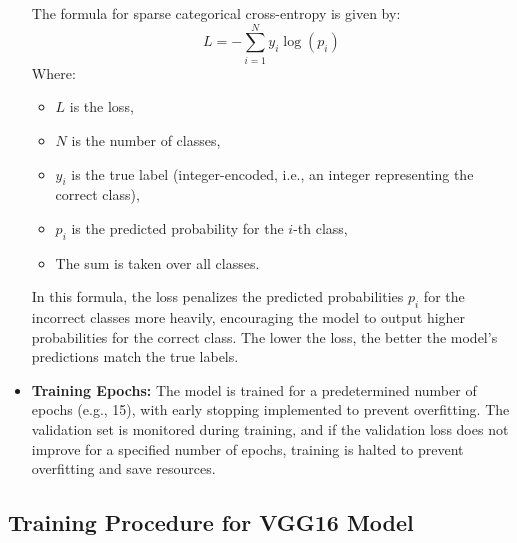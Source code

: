 \documentclass{article}
\begin{document}
\begin{itemize}
The formula for sparse categorical cross-entropy is given by:
\[
L = - \sum_{i=1}^{N} y_i \log(p_i)
\]
Where:
\begin{itemize}
    \item \( L \) is the loss,
    \item \( N \) is the number of classes,
    \item \( y_i \) is the true label (integer-encoded, i.e., an integer representing the correct class),
    \item \( p_i \) is the predicted probability for the \( i \)-th class,
    \item The sum is taken over all classes.
\end{itemize}

In this formula, the loss penalizes the predicted probabilities \( p_i \) for the incorrect classes more heavily, encouraging the model to output higher probabilities for the correct class. The lower the loss, the better the model's predictions match the true labels.

    \item \textbf{Training Epochs:} The model is trained for a predetermined number of epochs (e.g., 15), with early stopping implemented to prevent overfitting. The validation set is monitored during training, and if the validation loss does not improve for a specified number of epochs, training is halted to prevent overfitting and save resources.
\end{itemize}




\subsection{Training Procedure for VGG16  Model}
\end{document}
